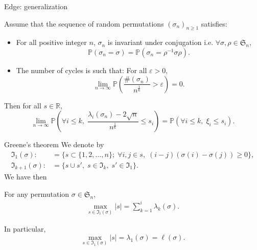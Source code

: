 \documentclass[english,xcolor=table]{beamer}
\begin{document}
\begin{frame}{Edge: generalization}
    \begin{theorem}[\cite{sk}]
Assume that the sequence of random permutations  $(\sigma_n)_{n\geq 1}$ satisfies:
\begin{itemize}
\item  For all positive integer $n$, $\sigma_n$ is invariant under conjugation i.e.  $\forall \sigma , \rho \in \mathfrak{S}_n$,
\begin{equation}\tag{H1}
\mathbb{P}(\sigma_n=\sigma)=\mathbb{P}(\sigma_n=\rho^{-1}\sigma\rho).
\end{equation}
\item The number of cycles is such that: For all $\varepsilon>0$,
\begin{equation}\tag{H2}
\lim_{n\to \infty}\mathbb{P}\left(\frac{\#(\sigma_n)}{n^\frac 16 }>\varepsilon\right) =0.
\end{equation}
\end{itemize}
Then  for all  $s \in \mathbb{R}$,
\begin{equation*} 
\lim_{n\to \infty}\mathbb{P}\left(\forall i\leq k, \;\frac{\lambda_i(\sigma_n)-2\sqrt{n}}{n^\frac{1}{6}}\leq s_i\right)=\mathbb{P}(\forall i\leq k,\;\xi_i\leq s_i).\end{equation*}
\end{theorem}
\end{frame}

\begin{frame}{Greene's theorem}
    We denote by  \begin{align*}
\mathfrak{I}_1(\sigma):&=\{s\subset\{1,2,\dots,n\};\; \forall i,j \in s,\; (i-j)(\sigma(i)-\sigma(j))\geq 0 \},
\\\mathfrak{I}_{k+1}(\sigma):&=\{s\cup s',\; s\in \mathfrak{I}_k,\;s'\in \mathfrak{I}_1\}.
\end{align*}
We have then
\begin{lemma}
For any permutation $ \sigma\in \mathfrak{S}_n$,
\begin{align*}
\max_{s\in \mathfrak{I}_i(\sigma)} |s| =\sum_{k=1}^i \lambda_k(\sigma).
\end{align*}
\end{lemma}
In particular, $$\max_{s\in \mathfrak{I}_1(\sigma)} |s| =\lambda_1(\sigma)=\ell(\sigma).$$
\end{frame}
\end{document}
